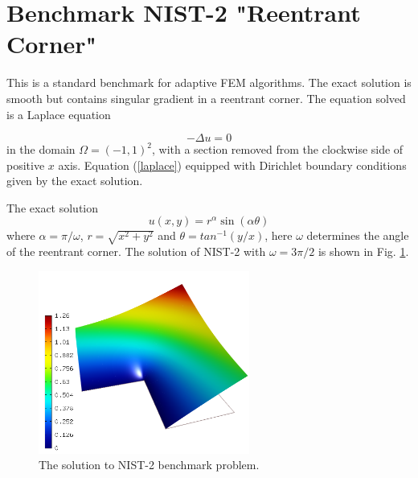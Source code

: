 \section{Benchmark NIST-2 "Reentrant Corner"}
\label{sec:bench-2}

This is a standard benchmark for adaptive FEM algorithms.
The exact solution is smooth but contains singular gradient in a reentrant corner.
The equation solved is a Laplace equation

\begin{equation} \label{laplace}
-\Delta u = 0
\end{equation}
in the domain $\Omega = (-1, 1)^2$, with a section
removed from the clockwise side of positive $x$ axis.
Equation (\ref{laplace}) equipped with Dirichlet
boundary conditions given by the exact solution.

The exact solution
\begin{equation}\label{exact-nist-2}
u(x, y) = r^{\alpha}\sin(\alpha \theta)
\end{equation}
where $\alpha = \pi / \omega$, $r = \sqrt{x^2+y^2}$ and $\theta = tan^{-1}(y/x)$, here $\omega $ determines
the angle of the reentrant corner.
The solution of NIST-2 with $\omega = 3 \pi / 2$  is shown in Fig. \ref{fig:sln-nist02}.

\begin{figure}[!ht]
\centering
\includegraphics[height=6cm]{nist/nist-2/solution.png}
\caption{The solution to NIST-2 benchmark problem.}
\label{fig:sln-nist02}
\end{figure}
